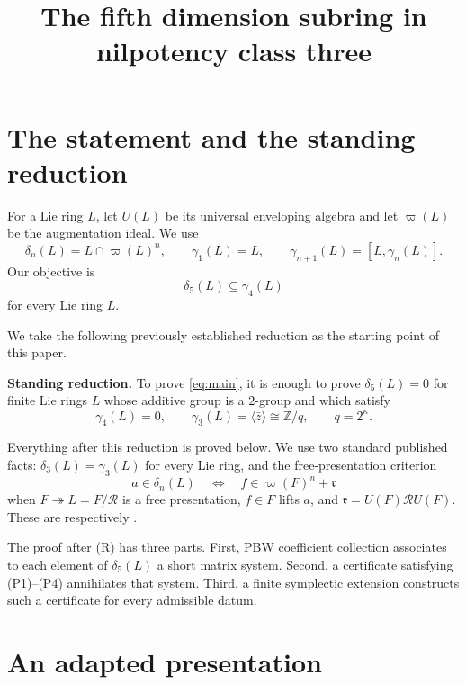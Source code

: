 \documentclass[11pt]{amsart}
\title{The fifth dimension subring in nilpotency class three}
\author{}
\date{}
\theoremstyle{definition}
\theoremstyle{remark}
\newcommand{\Z}{\mathbb Z}
\newcommand{\gam}{\gamma}
\newcommand{\del}{\delta}
\newcommand{\ww}{\varpi}
\begin{document}
\maketitle

\section{The statement and the standing reduction}

For a Lie ring \(L\), let \(U(L)\) be its universal enveloping
algebra and let \(\ww(L)\) be the augmentation ideal.  We use
\[
 \del_n(L)=L\cap\ww(L)^n,\qquad
 \gam_1(L)=L,\qquad \gam_{n+1}(L)=[L,\gam_n(L)].
\]
Our objective is
\begin{equation}\label{eq:main}
                         \del_5(L)\subseteq\gam_4(L)
\end{equation}
for every Lie ring \(L\).

We take the following previously established reduction as the starting
point of this paper.

\medskip
\noindent
\textbf{Standing reduction.}
To prove \eqref{eq:main}, it is enough to prove
\(\del_5(L)=0\) for finite Lie rings \(L\) whose additive group is a
\(2\)-group and which satisfy
\[
 \gam_4(L)=0,\qquad
 \gam_3(L)=\langle\bar z\rangle\cong\Z/q,\qquad q=2^\kappa .
\tag{R}
\]
\medskip

Everything after this reduction is proved below.  We use two standard
published facts: \(\del_3(L)=\gam_3(L)\) for every Lie ring, and the
free-presentation criterion
\begin{equation}\label{eq:presentation-criterion}
 a\in\del_n(L)
 \quad\Longleftrightarrow\quad
 f\in\ww(F)^n+\mathfrak r
\end{equation}
when \(F\twoheadrightarrow L=F/\mathcal R\) is a free presentation,
\(f\in F\) lifts \(a\), and
\(\mathfrak r=U(F)\mathcal R U(F)\).  These are respectively
\cite[Theorem~4.5 and Proposition~4.2]{BP}.

The proof after \textup{(R)} has three parts.  First, PBW coefficient
collection associates to each element of \(\del_5(L)\) a short matrix
system.  Second, a certificate satisfying \textup{(P1)--(P4)}
annihilates that system.  Third, a finite symplectic extension
constructs such a certificate for every admissible datum.

\section{An adapted presentation}
\end{document}
